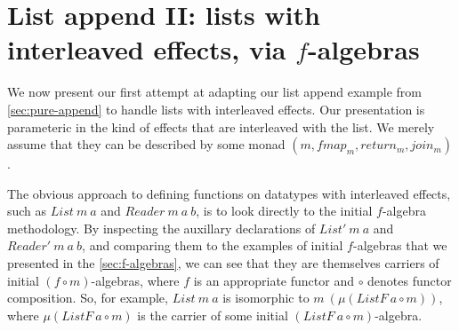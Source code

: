 \documentclass{jfp1}
\begin{document}


\section{List append II: lists with interleaved effects, via $f$-algebras}
\label{sec:direct-eappend}

We now present our first attempt at adapting our list append example
from \autoref{sec:pure-append} to handle lists with interleaved
effects. Our presentation is parameteric in the kind of effects that
are interleaved with the list. We merely assume that they can be
described by some monad $(m, \mathit{fmap_m}, \mathit{return_m},
\mathit{join_m})$.

The obvious approach to defining functions on datatypes with
interleaved effects, such as $\mathit{List}~m~a$ and
$\mathit{Reader}~m~a~b$, is to look directly to the initial
$f$-algebra methodology. By inspecting the auxillary declarations of
$\mathit{List'}~m~a$ and $\mathit{Reader'}~m~a~b$, and comparing them
to the examples of initial $f$-algebras that we presented in the
\autoref{sec:f-algebras}, we can see that they are themselves carriers
of initial $(f \circ m)$-algebras, where $f$ is an appropriate functor
and $\circ$ denotes functor composition. So, for example,
$\mathit{List}~m~a$ is isomorphic to $m~(\mu (\mathit{ListF}~a \circ
m))$, where $\mu (\mathit{ListF}~a \circ m)$ is the carrier of some
initial $(\mathit{ListF}~a \circ m)$-algebra.
\end{document}
